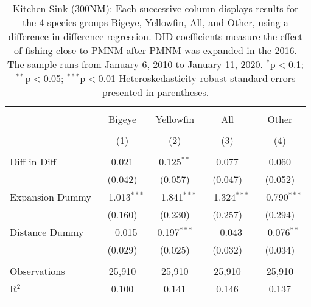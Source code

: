 
\begin{table}[!htbp] \centering 
  \caption{Kitchen Sink (300NM): Each successive column displays results for the 4 species groups Bigeye, Yellowfin, All, and Other, using a difference-in-difference regression. DID coefficients measure the effect of fishing close to PMNM after PMNM was expanded in the 2016. The sample runs from January 6, 2010 to January 11, 2020. $^{*}$p$<$0.1; $^{**}$p$<$0.05; $^{***}$p$<$0.01 Heteroskedasticity-robust standard errors presented in parentheses.} 
  \label{tbl:kitchenFE300NM} 
\begin{tabular}{@{\extracolsep{5pt}}lcccc} 
\\[-1.8ex]\hline 
\hline \\[-1.8ex] 
 & Bigeye & Yellowfin & All & Other \\ 
\\[-1.8ex] & (1) & (2) & (3) & (4)\\ 
\hline \\[-1.8ex] 
 Diff in Diff & 0.021 & 0.125$^{**}$ & 0.077 & 0.060 \\ 
  & (0.042) & (0.057) & (0.047) & (0.052) \\ 
  Expansion Dummy & $-$1.013$^{***}$ & $-$1.841$^{***}$ & $-$1.324$^{***}$ & $-$0.790$^{***}$ \\ 
  & (0.160) & (0.230) & (0.257) & (0.294) \\ 
  Distance Dummy & $-$0.015 & 0.197$^{***}$ & $-$0.043 & $-$0.076$^{**}$ \\ 
  & (0.029) & (0.025) & (0.032) & (0.034) \\ 
 \hline \\[-1.8ex] 
Observations & 25,910 & 25,910 & 25,910 & 25,910 \\ 
R$^{2}$ & 0.100 & 0.141 & 0.146 & 0.137 \\ 
\hline 
\hline \\[-1.8ex] 
\end{tabular} 
\end{table} 
